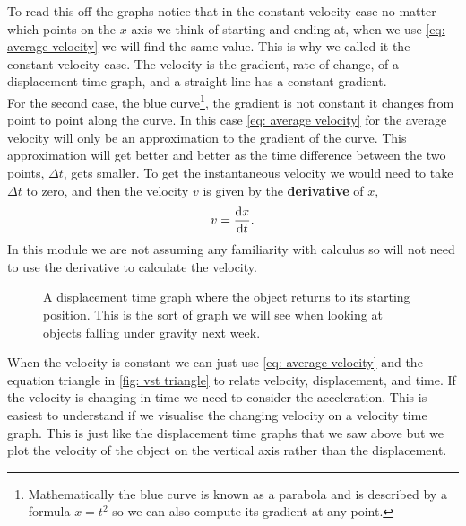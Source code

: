 \documentclass[a4paper,12pt]{book}
\begin{document}
To read this off the graphs notice that in the constant velocity case no matter which points on the $x$-axis we think of starting and ending at, when we use \cref{eq: average velocity} we will find the same value. This is why we called it the constant velocity case. The velocity is the gradient, rate of change, of a displacement time graph, and a straight line has a constant gradient.\\

For the second case, the blue curve\footnote{Mathematically the blue curve is known as a parabola and is described by a formula $x=t^{2}$ so we can also compute its gradient at any point.}, the gradient is not constant it changes from point to point along the curve. In this case \cref{eq: average velocity} for the average velocity will only be an approximation to the gradient of the curve. This approximation will get better and better as the time difference between the two points, $\Delta t$, gets smaller. To get the instantaneous velocity we would need to take $\Delta t$ to zero, and then the velocity $v$ is given by the \textbf{derivative} of $x$,
\begin{equation*}
    v=\frac{\mathrm{d} x}{\mathrm{d} t}.
\end{equation*}
In this module we are not assuming any familiarity with calculus so will not need to use the derivative to calculate the velocity. 

\begin{figure}[ht]
    \centering
    \caption{A displacement time graph where the object returns to its starting position. This is the sort of graph we will see when looking at objects falling under gravity next week.}
    \label{fig: displacement time graph 2}
\end{figure}

When the velocity is constant we can just use \cref{eq: average velocity} and the equation triangle in \cref{fig: vst triangle} to relate velocity, displacement, and time. If the velocity is changing in time we need to consider the acceleration. This is easiest to understand if we visualise the changing velocity on a velocity time graph. This is just like the displacement time graphs that we saw above but we plot the velocity of the object on the vertical axis rather than the displacement.\\
\end{document}
